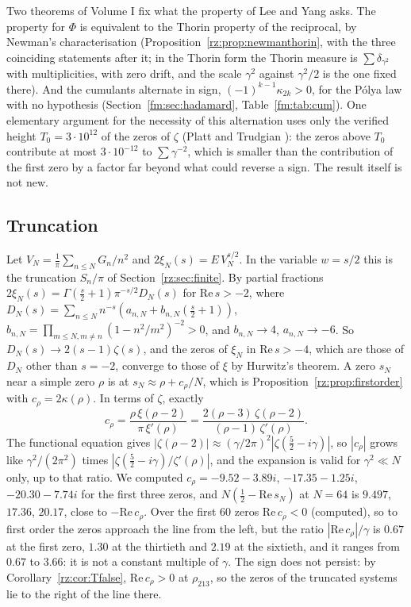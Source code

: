 Two theorems of Volume I fix what the property of Lee and Yang asks. The property for $\Phi$ is equivalent to the Thorin property of the reciprocal, by Newman's characterisation \cite{Newman74} (Proposition~\ref{rz:prop:newmanthorin}, with the three coinciding statements after it; in the Thorin form the Thorin measure is $\sum\delta_{\gamma^2}$ with multiplicities, with zero drift, and the scale $\gamma^2$ against $\gamma^2/2$ is the one fixed there). And the cumulants alternate in sign, $(-1)^{k-1}\kappa_{2k}>0$, for the P\'olya law with no hypothesis (Section~\ref{fm:sec:hadamard}, Table~\ref{fm:tab:cum}). One elementary argument for the necessity of this alternation uses only the verified height $T_0=3\cdot10^{12}$ of the zeros of $\zeta$ (Platt and Trudgian \cite{PT21}): the zeros above $T_0$ contribute at most $3\cdot10^{-12}$ to $\sum\gamma^{-2}$, which is smaller than the contribution of the first zero by a factor far beyond what could reverse a sign. The result itself is not new.

\subsection{Truncation}\label{lxi:sub:trunc}

Let $V_N=\frac1\pi\sum_{n\le N}G_n/n^2$ and $2\xi_N(s)=E\,V_N^{s/2}$. In the variable $w=s/2$ this is the truncation $S_n/\pi$ of Section~\ref{rz:sec:finite}. By partial fractions $2\xi_N(s)=\Gamma(\frac s2+1)\pi^{-s/2}D_N(s)$ for $\mathrm{Re}\,s>-2$, where $D_N(s)=\sum_{n\le N}n^{-s}(a_{n,N}+b_{n,N}(\frac s2+1))$, $b_{n,N}=\prod_{m\le N,m\ne n}(1-n^2/m^2)^{-2}>0$, and $b_{n,N}\to4$, $a_{n,N}\to-6$. So $D_N(s)\to2(s-1)\zeta(s)$, and the zeros of $\xi_N$ in $\mathrm{Re}\,s>-4$, which are those of $D_N$ other than $s=-2$, converge to those of $\xi$ by Hurwitz's theorem. A zero $s_N$ near a simple zero $\rho$ is at $s_N\approx\rho+c_\rho/N$, which is Proposition~\ref{rz:prop:firstorder} with $c_\rho=2\kappa(\rho)$. In terms of $\zeta$, exactly
\[
c_\rho=\frac{\rho\,\xi(\rho-2)}{\pi\,\xi'(\rho)}=\frac{2(\rho-3)\,\zeta(\rho-2)}{(\rho-1)\,\zeta'(\rho)} .
\]
The functional equation gives $|\zeta(\rho-2)|\approx(\gamma/2\pi)^2|\zeta(\frac52-i\gamma)|$, so $|c_\rho|$ grows like $\gamma^2/(2\pi^2)$ times $|\zeta(\frac52-i\gamma)/\zeta'(\rho)|$, and the expansion is valid for $\gamma^2\ll N$ only, up to that ratio. We computed $c_\rho=-9.52-3.89i$, $-17.35-1.25i$, $-20.30-7.74i$ for the first three zeros, and $N(\frac12-\mathrm{Re}\,s_N)$ at $N=64$ is $9.497$, $17.36$, $20.17$, close to $-\mathrm{Re}\,c_\rho$. Over the first $60$ zeros $\mathrm{Re}\,c_\rho<0$ (computed), so to first order the zeros approach the line from the left, but the ratio $|\mathrm{Re}\,c_\rho|/\gamma$ is $0.67$ at the first zero, $1.30$ at the thirtieth and $2.19$ at the sixtieth, and it ranges from $0.67$ to $3.66$: it is not a constant multiple of $\gamma$. The sign does not persist: by Corollary~\ref{rz:cor:Tfalse}, $\mathrm{Re}\,c_\rho>0$ at $\rho_{213}$, so the zeros of the truncated systems lie to the right of the line there.


